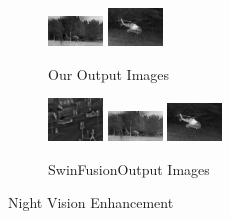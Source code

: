 \begin{figure}[htbp]
\begin{subfigure}[b]{\textwidth}
        \includegraphics[width=0.16\textwidth, height=0.1\textheight]{imgs/ch5/ours/07.jpg}
        \includegraphics[width=0.16\textwidth, height=0.1\textheight]{imgs/ch5/ours/11.jpg}
        \captionsetup{justification=raggedright,singlelinecheck=false}
        \caption{Our Output Images}
        \label{fig:ch5:met4:ours}
    \end{subfigure}
    \vspace{0.01cm}
    \begin{subfigure}[b]{\textwidth}
        \includegraphics[width=0.16\textwidth, height=0.1\textheight]{imgs/ch5/swinFusion/02.jpg}
        \includegraphics[width=0.16\textwidth, height=0.1\textheight]{imgs/ch5/swinFusion/07.jpg}
        \includegraphics[width=0.16\textwidth, height=0.1\textheight]{imgs/ch5/swinFusion/11.jpg}
        \captionsetup{justification=raggedright,singlelinecheck=false}
        \caption{SwinFusion\cite{ma2022swinfusion}Output Images}
        \label{fig:ch5:met4:swin}
    \end{subfigure}
    \captionsetup{justification=raggedright,singlelinecheck=false}
        \caption{Night Vision Enhancement}
    \label{fig:ch5:met4}
\end{figure}

